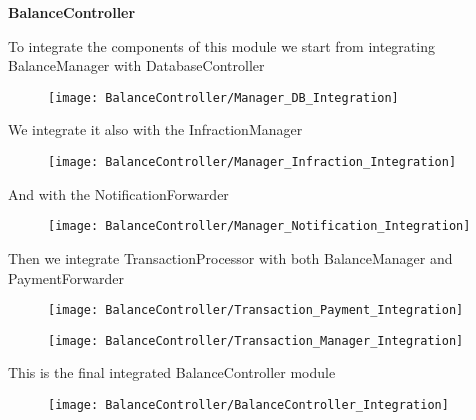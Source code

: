 \begin{Large}
\textbf{BalanceController}
\end{Large}

To integrate the components of this module we start from integrating BalanceManager with DatabaseController
\begin{figure}[H]
\centering
\texttt{[image: BalanceController/Manager\_DB\_Integration]}
\end{figure}

We integrate it also with the InfractionManager
\begin{figure}[H]
\centering
\texttt{[image: BalanceController/Manager\_Infraction\_Integration]}
\end{figure}

And with the NotificationForwarder
\begin{figure}[H]
\centering
\texttt{[image: BalanceController/Manager\_Notification\_Integration]}
\end{figure}

Then we integrate TransactionProcessor with both BalanceManager and PaymentForwarder
\begin{figure}[H]
\centering
\texttt{[image: BalanceController/Transaction\_Payment\_Integration]}
\end{figure}

\begin{figure}[H]
\centering
\texttt{[image: BalanceController/Transaction\_Manager\_Integration]}
\end{figure}

This is the final integrated BalanceController module
\begin{figure}[H]
\centering
\texttt{[image: BalanceController/BalanceController\_Integration]}
\end{figure}